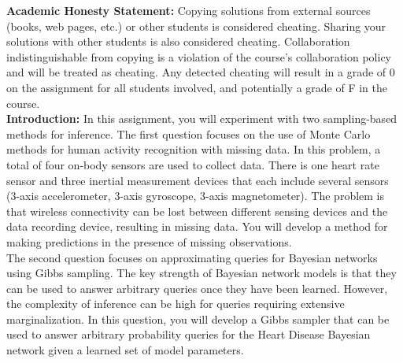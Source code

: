 \documentclass[11pt]{article}
\begin{document}
\textbf{Academic Honesty Statement:} Copying solutions from external
sources (books, web pages, etc.) or other students is considered
cheating. Sharing your solutions with other students is also
considered cheating. Collaboration indistinguishable from copying is a violation 
of the course's collaboration policy and will be treated as cheating.
Any detected cheating will result in a grade of 0
on the assignment for all students involved, and potentially a grade
of F in the course.\\


\textbf{Introduction:} In this assignment, you will experiment with two sampling-based methods for inference. The first question focuses on the use of Monte Carlo methods for human activity recognition with missing data. In this problem, a total of four on-body sensors are used to collect data. There is one heart rate sensor and three inertial measurement devices that each include several sensors (3-axis accelerometer, 3-axis gyroscope, 3-axis magnetometer). The problem is that wireless connectivity can be lost between different sensing devices and the data recording device, resulting in missing data. You will develop a method for making predictions in the presence of missing observations.\\

The second question focuses on approximating queries for Bayesian networks using Gibbs sampling. The key strength of Bayesian network models is that they can be used to answer arbitrary queries once they have been learned. However, the complexity of inference can be high for queries requiring extensive marginalization. In this question, you will develop a Gibbs sampler that can be used to answer arbitrary probability queries for the Heart Disease Bayesian network given a learned set of model parameters.
\\
\end{document}
